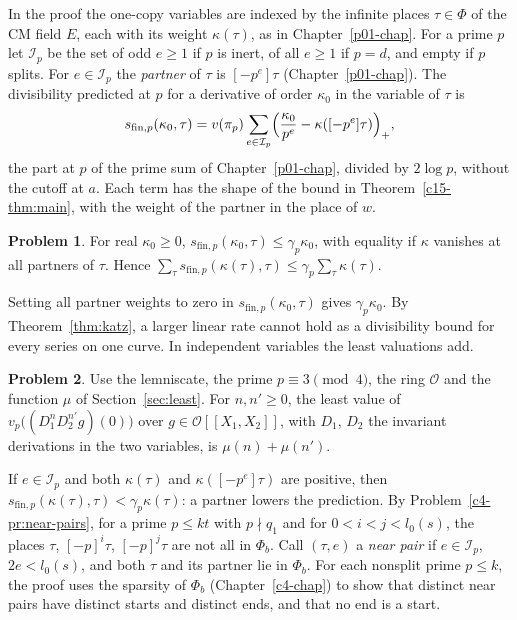 \documentclass[reqno]{amsart}
\newcounter{chap}
\theoremstyle{definition}
\newtheorem{problem}{Problem}[section]
\theoremstyle{plain}
\newcommand{\Oc}{\mathcal{O}}
\begin{document}
In the proof the one-copy variables are indexed by the infinite places \(\tau \in \Phi\) of the CM field \(E\), each with its weight \(\kappa(\tau)\), as in Chapter~\ref{p01-chap}.  For a prime \(p\) let \(\mathcal I_p\) be the set of odd \(e \ge 1\) if \(p\) is inert, of all \(e \ge 1\) if \(p = d\), and empty if \(p\) splits.  For \(e \in \mathcal I_p\) the \emph{partner} of \(\tau\) is \([-p^e]\tau\) (Chapter~\ref{p01-chap}).  The divisibility predicted at \(p\) for a derivative of order \(\kappa_0\) in the variable of \(\tau\) is
\[
  s_{\mathrm{fin},p}(\kappa_0, \tau) = v(\pi_p) \sum_{e \in \mathcal I_p} \Bigl( \frac{\kappa_0}{p^e} - \kappa([-p^e]\tau) \Bigr)_+ ,
\]
the part at \(p\) of the prime sum of Chapter~\ref{p01-chap}, divided by \(2\log p\), without the cutoff at \(a\).  Each term has the shape of the bound in Theorem~\ref{c15-thm:main}, with the weight of the partner in the place of \(w\).

\begin{problem}\label{pr:prime-sum-rate}
For real \(\kappa_0 \ge 0\), \(s_{\mathrm{fin},p}(\kappa_0, \tau) \le \gamma_p \kappa_0\), with equality if \(\kappa\) vanishes at all partners of \(\tau\).  Hence \(\sum_\tau s_{\mathrm{fin},p}(\kappa(\tau), \tau) \le \gamma_p \sum_\tau \kappa(\tau)\).
\end{problem}

Setting all partner weights to zero in \(s_{\mathrm{fin},p}(\kappa_0, \tau)\) gives \(\gamma_p\kappa_0\).  By Theorem~\ref{thm:katz}, a larger linear rate cannot hold as a divisibility bound for every series on one curve.  In independent variables the least valuations add.

\begin{problem}\label{pr:product}
Use the lemniscate, the prime \(p \equiv 3 \pmod 4\), the ring \(\Oc\) and the function \(\mu\) of Section~\ref{sec:least}.  For \(n, n' \ge 0\), the least value of \(v_p\bigl((D_1^n D_2^{n'} g)(0)\bigr)\) over \(g \in \Oc[[X_1, X_2]]\), with \(D_1\), \(D_2\) the invariant derivations in the two variables, is \(\mu(n) + \mu(n')\).
\end{problem}

If \(e \in \mathcal I_p\) and both \(\kappa(\tau)\) and \(\kappa([-p^e]\tau)\) are positive, then \(s_{\mathrm{fin},p}(\kappa(\tau), \tau) < \gamma_p \kappa(\tau)\): a partner lowers the prediction.  By Problem~\ref{c4-pr:near-pairs}, for a prime \(p \le kt\) with \(p \nmid q_1\) and for \(0 < i < j < l_0(s)\), the places \(\tau\), \([-p]^i\tau\), \([-p]^j\tau\) are not all in \(\Phi_b\).  Call \((\tau, e)\) a \emph{near pair} if \(e \in \mathcal I_p\), \(2e < l_0(s)\), and both \(\tau\) and its partner lie in \(\Phi_b\).  For each nonsplit prime \(p\le k\), the proof uses the sparsity of \(\Phi_b\) (Chapter~\ref{c4-chap}) to show that distinct near pairs have distinct starts and distinct ends, and that no end is a start.
\end{document}
